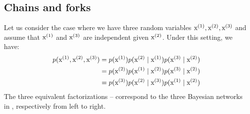 \subsection{Chains and forks}
\label{sec:chains_forks}
Let us consider the case where we have three random variables ${\textnormal{x}}^{(1)}, {\textnormal{x}}^{(2)}, {\textnormal{x}}^{(3)}$ and assume that ${\textnormal{x}}^{(1)}$ and ${\textnormal{x}}^{(3)}$ are independent given ${\textnormal{x}}^{(2)}$. Under this setting, we have:
\begin{align}
    p({\textnormal{x}}^{(1)}, {\textnormal{x}}^{(2)}, {\textnormal{x}}^{(3)}) &= p({\textnormal{x}}^{(1)}) p({\textnormal{x}}^{(2)} \mid {\textnormal{x}}^{(1)}) p({\textnormal{x}}^{(3)} \mid {\textnormal{x}}^{(2)}) \label{eq:chain}\\
    &= p({\textnormal{x}}^{(2)}) p({\textnormal{x}}^{(1)} \mid {\textnormal{x}}^{(2)}) p({\textnormal{x}}^{(3)} \mid {\textnormal{x}}^{(2)}) \label{eq:fork}\\
    &= p({\textnormal{x}}^{(3)}) p({\textnormal{x}}^{(2)} \mid {\textnormal{x}}^{(3)}) p({\textnormal{x}}^{(1)} \mid {\textnormal{x}}^{(2)}) \label{eq:reversed_chain}
\end{align}
The three equivalent factorizations  --  correspond to the three Bayesian networks in , respectively from left to right.

